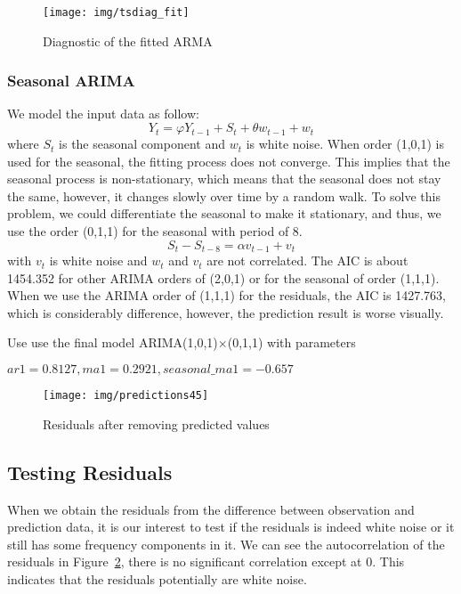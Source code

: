 \documentclass[12pt]{article}
\begin{document}
\begin{figure}[ht!]
\centering
\texttt{[image: img/tsdiag\_fit]}
\caption{Diagnostic of the fitted ARMA}\label{fig:tsdiag_fit}
\end{figure}

\subsubsection{Seasonal ARIMA}
We model the input data as follow:
\begin{equation}
Y_t = \varphi Y_{t-1}+S_t+ \theta w_{t-1}+w_t
\end{equation}
where $S_t$ is the seasonal component and $w_t$ is white noise. When order
(1,0,1) is used for the seasonal, the fitting process does not converge. This implies that the seasonal
process is non-stationary, which means that the seasonal does not
stay the same, however, it changes slowly over time by a random walk. To solve
this problem, we could differentiate the seasonal to make it stationary,
and thus, we use the order (0,1,1) for the seasonal with period of 8.
\begin{equation}
S_t - S_{t-8} = \alpha v_{t-1} + v_t
\end{equation}
with $v_t$ is white noise and $w_t$ and $v_t$ are not correlated. 
The AIC is about 1454.352 for other ARIMA orders of (2,0,1) or for the seasonal
of order (1,1,1). When we use the ARIMA order of (1,1,1) for the residuals, the
AIC is 1427.763, which is considerably difference, however, the prediction
result is worse visually. 

Use use the final model ARIMA(1,0,1)$\times$(0,1,1) with parameters  

$ar1=0.8127,ma1=0.2921, seasonal\_ma1=-0.657$

\begin{figure}[ht!]
\centering
\texttt{[image: img/predictions45]}
\caption{Residuals after removing predicted values}\label{fig:predictions45}
\end{figure}

\subsection{Testing Residuals}
When we obtain the residuals from the difference between observation and
prediction data, it is our interest to test if the residuals is indeed white
noise or it still has some frequency components in it. We can see the
autocorrelation of the residuals in Figure~\ref{fig:predictions45}, there is no
significant correlation except at 0. This indicates that the residuals
potentially are white noise.
\end{document}
